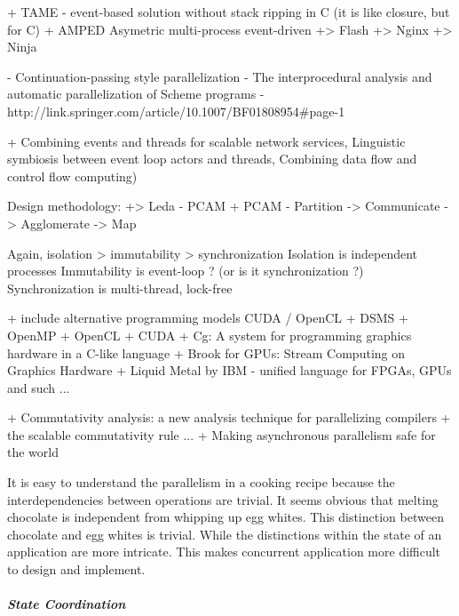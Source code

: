 + TAME - event-based solution without stack ripping in C (it is like closure, but for C)
    + AMPED Asymetric multi-process event-driven
    +> Flash
    +> Nginx
    +> Ninja

- Continuation-passing style parallelization
  - The interprocedural analysis and automatic parallelization of Scheme programs - http://link.springer.com/article/10.1007/BF01808954#page-1


+ Combining events and threads for scalable network services, Linguistic symbiosis between event loop actors and threads, Combining data flow and control flow computing)


Design methodology:
+> Leda - PCAM
+ PCAM - Partition -> Communicate -> Agglomerate -> Map

Again, isolation > immutability > synchronization
Isolation is independent processes
Immutability is event-loop ? (or is it synchronization ?)
Synchronization is multi-thread, lock-free

+ include alternative programming models CUDA / OpenCL + DSMS
  + OpenMP
  + OpenCL
  + CUDA
  + Cg: A system for programming graphics hardware in a C-like language
  + Brook for GPUs: Stream Computing on Graphics Hardware
  + Liquid Metal by IBM - unified language for FPGAs, GPUs and such ...

  + Commutativity analysis: a new analysis technique for parallelizing compilers
  + the scalable commutativity rule ...
  + Making asynchronous parallelism safe for the world


It is easy to understand the parallelism in a cooking recipe because the interdependencies between operations are trivial.
It seems obvious that melting chocolate is independent from whipping up egg whites.
This distinction between chocolate and egg whites is trivial.
While the distinctions within the state of an application are more intricate.
This makes concurrent application more difficult to design and implement.

\subparagraph{State Coordination}

